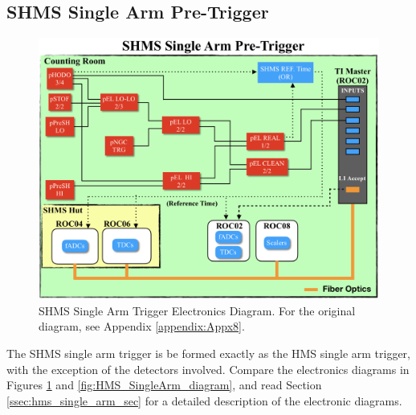 \documentclass[11pt]{article}
\begin{document}
\subsection{SHMS Single Arm Pre-Trigger}
\begin{figure}[h!]
  \centering
  \includegraphics[scale=0.5]{SHMS_SingleArm_diagram.png}
  \caption{SHMS Single Arm Trigger Electronics Diagram. For the original diagram, see Appendix \ref{appendix:Appx8}.}
  \label{fig:SHMS_SingleArm_diagram}
\end{figure}

\indent The SHMS single arm trigger is be formed exactly as the HMS single arm trigger, with the exception of the detectors involved. Compare the electronics diagrams in Figures \ref{fig:SHMS_SingleArm_diagram} and
\ref{fig:HMS_SingleArm_diagram}, and read Section \ref{ssec:hms_single_arm_sec} for a detailed description of the electronic diagrams. 
\newpage
\end{document}
